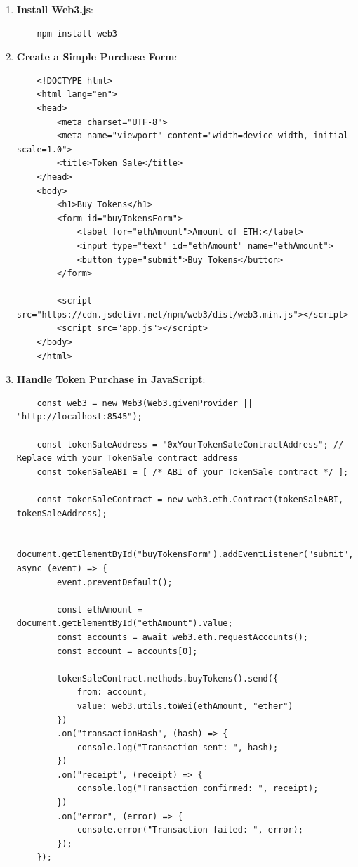\documentclass{tufte-handout}
\begin{document}
\begin{enumerate}
    \item \textbf{Install Web3.js}:
    \begin{verbatim}
    npm install web3
    \end{verbatim}
    \item \textbf{Create a Simple Purchase Form}:
    \begin{verbatim}
    <!DOCTYPE html>
    <html lang="en">
    <head>
        <meta charset="UTF-8">
        <meta name="viewport" content="width=device-width, initial-scale=1.0">
        <title>Token Sale</title>
    </head>
    <body>
        <h1>Buy Tokens</h1>
        <form id="buyTokensForm">
            <label for="ethAmount">Amount of ETH:</label>
            <input type="text" id="ethAmount" name="ethAmount">
            <button type="submit">Buy Tokens</button>
        </form>

        <script src="https://cdn.jsdelivr.net/npm/web3/dist/web3.min.js"></script>
        <script src="app.js"></script>
    </body>
    </html>
    \end{verbatim}
    \item \textbf{Handle Token Purchase in JavaScript}:
    \begin{verbatim}
    const web3 = new Web3(Web3.givenProvider || "http://localhost:8545");

    const tokenSaleAddress = "0xYourTokenSaleContractAddress"; // Replace with your TokenSale contract address
    const tokenSaleABI = [ /* ABI of your TokenSale contract */ ];

    const tokenSaleContract = new web3.eth.Contract(tokenSaleABI, tokenSaleAddress);

    document.getElementById("buyTokensForm").addEventListener("submit", async (event) => {
        event.preventDefault();

        const ethAmount = document.getElementById("ethAmount").value;
        const accounts = await web3.eth.requestAccounts();
        const account = accounts[0];

        tokenSaleContract.methods.buyTokens().send({
            from: account,
            value: web3.utils.toWei(ethAmount, "ether")
        })
        .on("transactionHash", (hash) => {
            console.log("Transaction sent: ", hash);
        })
        .on("receipt", (receipt) => {
            console.log("Transaction confirmed: ", receipt);
        })
        .on("error", (error) => {
            console.error("Transaction failed: ", error);
        });
    });
    \end{verbatim}
\end{enumerate}
\end{document}
